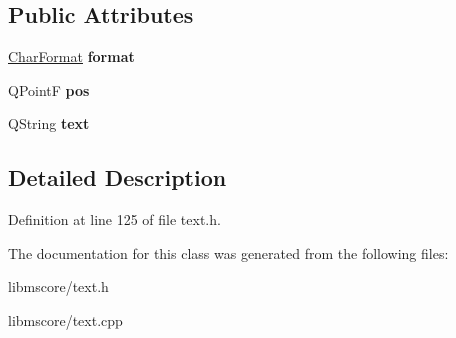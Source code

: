 \subsection*{Public Attributes}
\begin{DoxyCompactItemize}
\item 
\mbox{\label{class_ms_1_1_text_fragment_a1f4237b1a0bd0b97a0059b5ceb977ce5}} 
\hyperlink{class_ms_1_1_char_format}{Char\+Format} {\bfseries format}
\item 
\mbox{\label{class_ms_1_1_text_fragment_a5c7bff986e0abff0556b4318e495a859}} 
Q\+PointF {\bfseries pos}
\item 
\mbox{\label{class_ms_1_1_text_fragment_a573f59da3ff8104aed05f506209f367d}} 
Q\+String {\bfseries text}
\end{DoxyCompactItemize}


\subsection{Detailed Description}


Definition at line 125 of file text.\+h.



The documentation for this class was generated from the following files\+:\begin{DoxyCompactItemize}
\item 
libmscore/text.\+h\item 
libmscore/text.\+cpp\end{DoxyCompactItemize}
